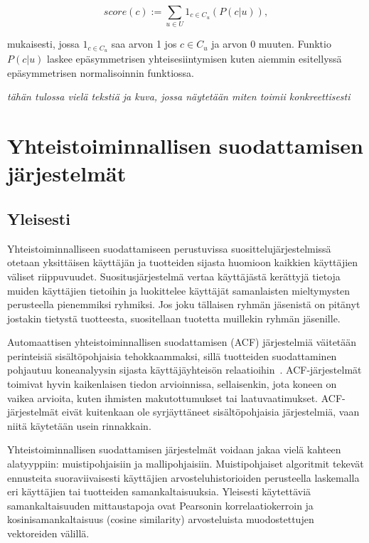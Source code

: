 \documentclass[12pt,finnish]{tktltiki2}
\theoremstyle{definition}
\theoremstyle{remark}
\begin{document}
\begin{displaymath}
score(c) := \sum_{u\in U}1_{c\in C_u}(P(c|u)),
\end{displaymath}

mukaisesti, jossa $1_{c\in C_u}$ saa arvon 1 jos $c\in C_u$ ja arvon 0 muuten. Funktio $P(c|u)$ laskee epäsymmetrisen yhteisesiintymisen kuten aiemmin esitellyssä epäsymmetrisen normalisoinnin funktiossa.

\textit{tähän tulossa vielä tekstiä ja kuva, jossa näytetään miten toimii konkreettisesti}


\section{Yhteistoiminnallisen suodattamisen järjestelmät}
\subsection{Yleisesti}
        Yhteistoiminnalliseen suodattamiseen perustuvissa suosittelujärjestelmissä otetaan yksittäisen käyttäjän ja tuotteiden sijasta huomioon kaikkien käyttäjien väliset riippuvuudet. Suositusjärjestelmä vertaa käyttäjästä kerättyjä tietoja muiden käyttäjien tietoihin ja luokittelee käyttäjät samanlaisten mieltymysten perusteella pienemmiksi ryhmiksi. Jos joku tällaisen ryhmän jäsenistä on pitänyt jostakin tietystä tuotteesta, suositellaan tuotetta muillekin ryhmän jäsenille.
        
         Automaattisen yhteistoiminnallisen suodattamisen (ACF) järjestelmiä väitetään perinteisiä sisältöpohjaisia tehokkaammaksi, sillä tuotteiden suodattaminen pohjautuu koneanalyysin sijasta käyttäjäyhteisön relaatioihin~\cite{Herlocker:2000:ECF:358916.358995}. ACF-järjestelmät toimivat hyvin kaikenlaisen tiedon arvioinnissa, sellaisenkin, jota koneen on vaikea arvioita, kuten ihmisten makutottumukset tai laatuvaatimukset. ACF-järjestelmät eivät kuitenkaan ole syrjäyttäneet sisältöpohjaisia järjestelmiä, vaan niitä käytetään usein rinnakkain.
         
         Yhteistoiminnallisen suodattamisen järjestelmät voidaan jakaa vielä kahteen alatyyppiin: muistipohjaisiin ja mallipohjaisiin. Muistipohjaiset algoritmit tekevät ennusteita suoraviivaisesti käyttäjien arvosteluhistorioiden perusteella laskemalla eri käyttäjien tai tuotteiden samankaltaisuuksia. Yleisesti käytettäviä samankaltaisuuden mittaustapoja ovat Pearsonin korrelaatiokerroin ja kosinisamankaltaisuus (cosine similarity) arvosteluista muodostettujen vektoreiden välillä.
         
\end{document}
